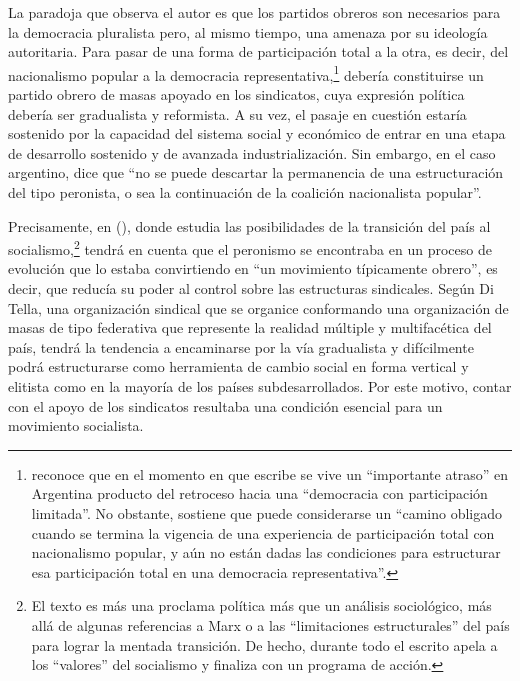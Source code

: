 La paradoja que observa el autor es que los partidos obreros son necesarios para la democracia pluralista pero, al mismo tiempo, una amenaza por su ideología autoritaria. Para pasar de una forma de participación total a la otra, es decir, del nacionalismo popular a la democracia representativa,\footnote{\textcite[112]{1649-DITELLA1964} reconoce que en el momento en que escribe se vive un \enquote{importante atraso} en Argentina producto del retroceso hacia una \enquote{democracia con participación limitada}. No obstante, sostiene que puede considerarse un \enquote{camino obligado cuando se termina la vigencia de una experiencia de participación total con nacionalismo popular, y aún no están dadas las condiciones para estructurar esa participación total en una democracia representativa}.} debería constituirse un partido obrero de masas apoyado en los sindicatos, cuya expresión política debería ser gradualista y reformista. A su vez, el pasaje en cuestión estaría sostenido por la capacidad del sistema social y económico de entrar en una etapa de desarrollo sostenido y de avanzada industrialización. Sin embargo, en el caso argentino, \textcite[68]{1649-DITELLA1964} dice que \enquote{no se puede descartar la permanencia de una estructuración del tipo peronista, o sea la continuación de la coalición nacionalista popular}.

Precisamente, en  (\citeyear{1657-DITELLA1965}), donde estudia las posibilidades de la transición del país al socialismo,\footnote{El texto es más una proclama política más que un análisis sociológico, más allá de algunas referencias a Marx o a las \enquote{limitaciones estructurales} \parencite{1705-MERTON2002} del país para lograr la mentada transición. De hecho, durante todo el escrito apela a los \enquote{valores} del socialismo y finaliza con un programa de acción.} tendrá en cuenta que el peronismo se encontraba en un proceso de evolución que lo estaba convirtiendo en \enquote{un movimiento típicamente obrero}, es decir, que reducía su poder al control sobre las estructuras sindicales. Según Di Tella, una organización sindical que se organice conformando una organización de masas de tipo federativa que represente la realidad múltiple y multifacética del país, tendrá la tendencia a encaminarse por la vía gradualista y difícilmente podrá estructurarse como herramienta de cambio social en forma vertical y elitista como en la mayoría de los países subdesarrollados. Por este motivo, contar con el apoyo de los sindicatos resultaba una condición esencial para un movimiento socialista.

